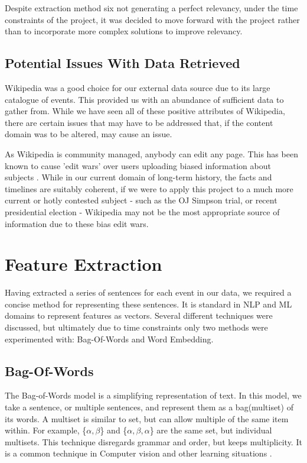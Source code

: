\documentclass[bsc,frontabs,twoside,singlespacing,parskip,deptreport]{infthesis}     %
\begin{document}
Despite extraction method six not generating a perfect relevancy, under the time constraints
of the project, it  was decided to move forward with the project rather than to incorporate more
complex solutions to improve relevancy.

\subsection{Potential Issues With Data Retrieved}\label{sec:dataIssues}
Wikipedia was a good choice for our external data source due to its large catalogue of events.
This provided us with an abundance of sufficient data to gather from.
While we have seen all of these positive attributes of Wikipedia, there are certain issues that may have to be addressed
that, if the content domain was to be altered, may cause an issue.

As Wikipedia is community managed, anybody can edit any page. This has been known to cause 'edit wars' over users
uploading biased information about subjects \cite{}.
While in our current domain of long-term history, the facts and timelines are suitably coherent, if we were to apply this project
to a much more current or hotly contested subject - such as the OJ Simpson trial, or recent presidential election - Wikipedia
may not be the most appropriate source of information due to these bias edit wars.


\section{Feature Extraction}\label{sec:representation}
Having extracted a series of sentences for each event in our data, we required a concise method
for representing these sentences. It is standard in NLP and ML domains to represent features as vectors.
Several different techniques were discussed, but ultimately due to time constraints only two methods were
experimented with: Bag-Of-Words and Word Embedding.
\subsection{Bag-Of-Words}
The Bag-of-Words model is a simplifying representation of text.
In this model, we take a sentence, or multiple sentences, and represent them as a bag(multiset) of its words.
A multiset is similar to set, but can allow multiple of the same item within.
For example, \{$\alpha,\beta$\} and \{$\alpha,\beta,\alpha$\} are the same set, but individual multisets.
This technique disregards grammar and order, but keeps multiplicity. It is a common technique in Computer vision
and other learning situations \cite{sivic2009efficient}.
\end{document}
